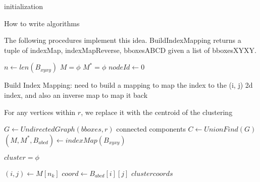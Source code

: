 \documentclass{\SetClass}
\begin{document}
\begin{algorithm}[H]
  \SetAlgoLined

  initialization\;
  \caption{How to write algorithms}
\end{algorithm}


The following procedures implement this idea. BuildIndexMapping returns a tuple of indexMap, indexMapReverse, bboxesABCD given a list of bboxesXYXY.

\begin{algorithm}[H]
  \SetAlgoLined
  $n \leftarrow len(B_{xyxy}) $ \;
  $M = \phi $ \;
  $M^* = \phi $ \;
  $nodeId \leftarrow 0 $ \;
  \caption{Build Index Mapping: need to build a mapping to map the index to the (i, j) 2d index, and also an inverse map to map it back}
\end{algorithm}


\begin{algorithm}[H]
  \SetAlgoLined
  \caption{For any vertices within $r$, we replace it with the centroid of the clustering}
  $G \leftarrow UndirectedGraph(bboxes, r)$ \;
  connected components $C \leftarrow UnionFind(G)$\;
  $(M, M^*, B_{abcd}) \leftarrow  indexMap(B_{xyxy}) $\;
   {
    $cluster = \phi$ \;
     {
        $(i, j) \leftarrow M[n_k] $\;
        $coord \leftarrow B_{abcd}[i][j] $ \;
        $clustercoords $
        
    }
  }
\end{algorithm}


\end{document}
